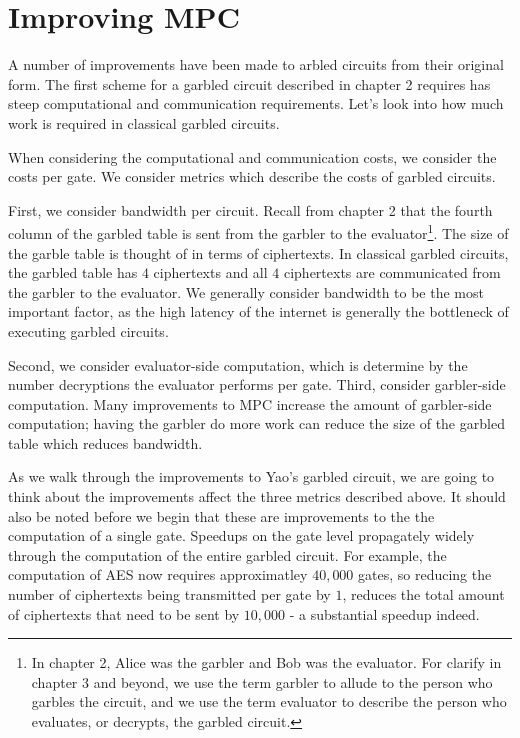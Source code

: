 \chapter{Improving MPC}
A number of improvements have been made to  arbled circuits from their original form.
The first scheme for a garbled circuit described in chapter 2 requires has steep computational and communication requirements.
Let's look into how much work is required in classical garbled circuits.

When considering the computational and communication costs, we consider the costs per gate.
We consider  metrics which describe the costs of garbled circuits.

First, we consider bandwidth per circuit.
Recall from chapter 2 that the fourth column of the garbled table is sent from the garbler to the evaluator\footnote{In chapter 2, Alice was the garbler and Bob was the evaluator. For clarify in chapter 3 and beyond, we use the term garbler to allude to the person who garbles the circuit, and we use the term evaluator to describe the person who evaluates, or decrypts, the garbled circuit.}.
The size of the garble table is thought of in terms of ciphertexts. 
In classical garbled circuits, the garbled table has $4$ ciphertexts and all $4$ ciphertexts are communicated from the garbler to the evaluator.
We generally consider bandwidth to be the most important factor, as the high latency of the internet is generally the bottleneck of executing garbled circuits.

Second, we consider evaluator-side computation, which is determine by the number decryptions the evaluator performs per gate.
Third, consider garbler-side computation.
Many improvements to MPC increase the amount of garbler-side computation; having the garbler do more work can reduce the size of the garbled table which reduces bandwidth.

As we walk through the improvements to Yao's garbled circuit, we are going to think about the improvements affect the three metrics described above.
It should also be noted before we begin that these are improvements to the the computation of a single gate.
Speedups on the gate level propagately widely through the computation of the entire garbled circuit.
For example, the computation of AES now requires approximatley $40,000$ gates, so reducing the number of ciphertexts being transmitted per gate by $1$, reduces the total amount of ciphertexts that need to be sent by $10,000$ - a substantial speedup indeed.

